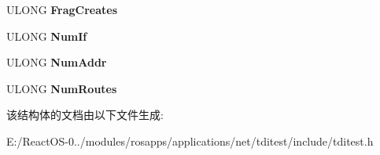 \begin{DoxyCompactItemize}
\mbox{\label{struct_i_p_s_n_m_p___i_n_f_o_ad47569b6efd59102910609c4ed1e3207}} 
U\+L\+O\+NG {\bfseries Frag\+Creates}
\item 
\mbox{\label{struct_i_p_s_n_m_p___i_n_f_o_a7ca76ece6341ff4c6de767de85ed2f2a}} 
U\+L\+O\+NG {\bfseries Num\+If}
\item 
\mbox{\label{struct_i_p_s_n_m_p___i_n_f_o_a4e1cbc543df25fb785eee1628bbffb51}} 
U\+L\+O\+NG {\bfseries Num\+Addr}
\item 
\mbox{\label{struct_i_p_s_n_m_p___i_n_f_o_abb02eadbf1f493d19a2437acb14b02af}} 
U\+L\+O\+NG {\bfseries Num\+Routes}
\end{DoxyCompactItemize}


该结构体的文档由以下文件生成\+:\begin{DoxyCompactItemize}
\item 
E\+:/\+React\+O\+S-\/0../modules/rosapps/applications/net/tditest/include/tditest.\+h\end{DoxyCompactItemize}
